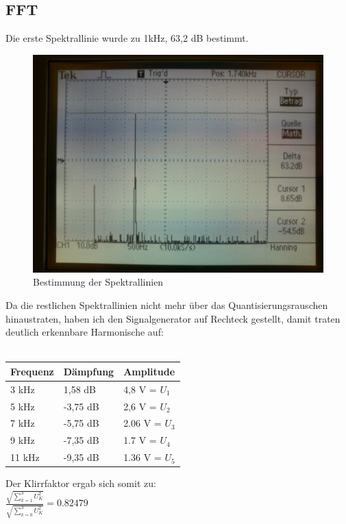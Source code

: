 \subsection{FFT}
Die erste Spektrallinie wurde zu 1kHz, 63,2 dB bestimmt.
\begin{figure}[H]
	\centering
	\includegraphics[width=\linewidth]{versuch4/oszi/DSC_0416.JPG}
	\caption{Bestimmung der Spektrallinien}
\end{figure}
Da die restlichen Spektrallinien nicht mehr über das Quantisierungsrauschen hinaustraten, haben ich den Signalgenerator auf Rechteck gestellt, damit traten deutlich erkennbare Harmonische auf:\\\\
\begin{tabular}{|l|l|l|}
	\hline
	Frequenz & Dämpfung & Amplitude\\
	\hline
	\hline
	3 kHz & 1,58 dB & 4,8 V = $U_1$\\
	\hline
	5 kHz & -3,75 dB & 2,6 V = $U_2$\\
	\hline
	7 kHz & -5,75 dB & 2.06 V = $U_3$\\
	\hline
	9 kHz & -7,35 dB & 1.7 V = $U_4$\\
	\hline
	11 kHz & -9,35 dB & 1.36 V = $U_5$\\
	\hline
\end{tabular}
\vspace{0.3cm}

Der Klirrfaktor ergab sich somit zu:\\
$ \frac{\sqrt{\sum_{k=1}^3U_K^2}}{\sqrt{\sum_{k=0}^3U_K^2}} =  0.82479 $


